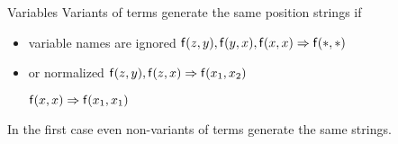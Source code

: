 

	
	\begin{block}{Variables}
		Variants of terms generate the same position strings
		\pause
		if
		\begin{itemize}
			\item variable names are ignored 
			\hfill${\mathsf f}(z,y), {\mathsf f}(y,x), {\mathsf f}(x,x) \Rightarrow {\mathsf f}(*,*)$
			\pause
			\item or normalized 
			\hfill${\mathsf f}(z,y), {\mathsf f}(z,x) \Rightarrow {\mathsf f}(x_1,x_2)$
			
			\hfill${\mathsf f}(x,x)\Rightarrow{\mathsf f}(x_1,x_1)$
		\end{itemize}
		\pause
		In the first case even non-variants of terms generate the same strings.
\end{block}
\pause